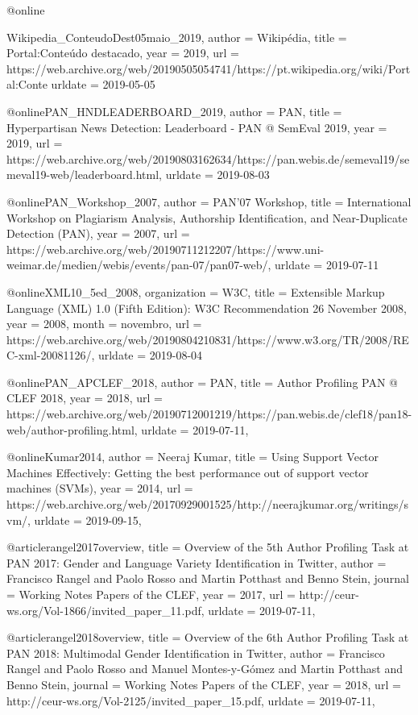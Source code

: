 @online{Wikipedia_ConteudoDest05maio_2019,
  author = {Wikipédia},
  title = {Portal:Conteúdo destacado},
  year = 2019,
  url = {https://web.archive.org/web/20190505054741/https://pt.wikipedia.org/wiki/Portal:Conte%
  urldate = {2019-05-05}
}

@online{PAN_HNDLEADERBOARD_2019,
  author = {PAN},
  title = {{Hyperpartisan News Detection}: Leaderboard - PAN @ SemEval 2019},
  year = 2019,
  url = {https://web.archive.org/web/20190803162634/https://pan.webis.de/semeval19/semeval19-web/leaderboard.html},
  urldate = {2019-08-03}
}

@online{PAN_Workshop_2007,
  author = {{PAN'07 Workshop}},
  title = {International Workshop on Plagiarism Analysis, Authorship Identification, and Near-Duplicate Detection (PAN)},
  year = 2007,
  url = {https://web.archive.org/web/20190711212207/https://www.uni-weimar.de/medien/webis/events/pan-07/pan07-web/},
  urldate = {2019-07-11}
}

@online{XML10_5ed_2008,
  organization = {W3C},
  title = {Extensible Markup Language (XML) 1.0 (Fifth Edition): W3C Recommendation 26 November 2008},
  year = {2008},
  month = {novembro},
  url = {https://web.archive.org/web/20190804210831/https://www.w3.org/TR/2008/REC-xml-20081126/},
  urldate = {2019-08-04}
}


@online{PAN_APCLEF_2018,
  author = {PAN},
  title = {{Author Profiling} PAN @ CLEF 2018},
  year = 2018,
  url = {https://web.archive.org/web/20190712001219/https://pan.webis.de/clef18/pan18-web/author-profiling.html},
  urldate = {2019-07-11},
}

@online{Kumar2014,
  author = {Neeraj Kumar},
  title = {{Using Support Vector Machines Effectively}: Getting the best performance out of support vector machines (SVMs)},
  year = 2014,
  url = {https://web.archive.org/web/20170929001525/http://neerajkumar.org/writings/svm/},
  urldate = {2019-09-15},
}



@article{rangel2017overview,
  title = {{O}verview of the 5th {A}uthor {P}rofiling {T}ask at {PAN} 2017: {G}ender and {L}anguage {V}ariety {I}dentification in {T}witter},
  author = {Francisco Rangel and Paolo Rosso and Martin Potthast and Benno Stein},
  journal = {Working Notes Papers of the CLEF},
  year = {2017},
  url = {http://ceur-ws.org/Vol-1866/invited_paper_11.pdf},
  urldate = {2019-07-11},
}

@article{rangel2018overview,
  title = {{O}verview of the 6th {A}uthor {P}rofiling {T}ask at {PAN} 2018: {M}ultimodal {G}ender {I}dentification in {T}witter},
  author = {Francisco Rangel and Paolo Rosso and Manuel Montes-y-Gómez and Martin Potthast and Benno Stein},
  journal = {Working Notes Papers of the CLEF},
  year = {2018},
  url = {http://ceur-ws.org/Vol-2125/invited_paper_15.pdf},
  urldate = {2019-07-11},
}

}
